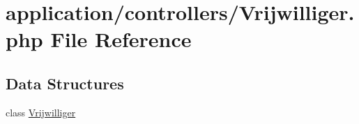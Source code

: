 \hypertarget{_vrijwilliger_8php}{}\section{application/controllers/\+Vrijwilliger.php File Reference}
\label{_vrijwilliger_8php}
\subsection*{Data Structures}
\begin{DoxyCompactItemize}
\item 
class \mbox{\hyperlink{class_vrijwilliger}{Vrijwilliger}}
\end{DoxyCompactItemize}
